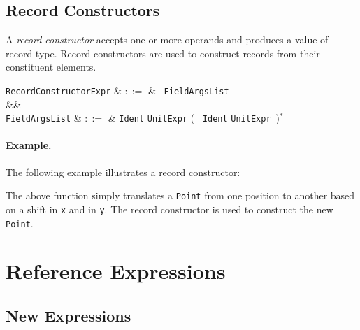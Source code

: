 
\subsection{Record Constructors}
\label{c_expr_record_constructor}
A {\em record constructor} accepts one or more operands and produces a value of record type.  Record constructors are used to construct records from their constituent elements.  

\begin{syntax}
  \verb+RecordConstructorExpr+ & $::=$ & \token{\{}\ \verb+FieldArgsList+\ \token{\}}\\
&&\\
  \verb+FieldArgsList+ & $::=$ & \verb+Ident+ \token{:} \verb+UnitExpr+ \big(\ \token{,} \verb+Ident+ \token{:} \verb+UnitExpr+\ \big)$^*$\\
\end{syntax}

\paragraph{Example.} The following example illustrates a record constructor:



The above function simply translates a \lstinline{Point} from one position to another based on a shift in \lstinline{x} and in \lstinline{y}.  The record constructor is used to construct the new \lstinline{Point}.

\section{Reference Expressions}


\subsection{New Expressions}
\label{c_expr_new}

